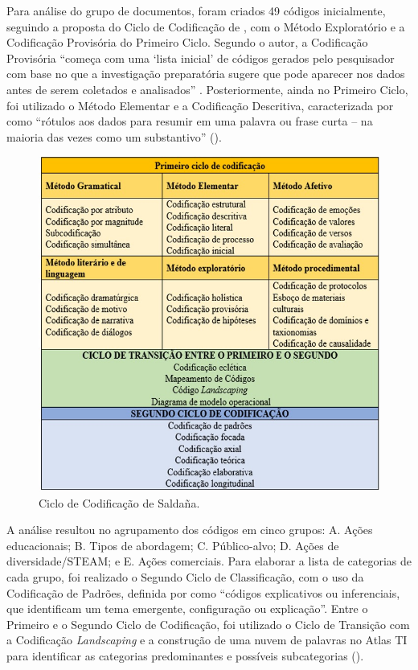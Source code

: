 \documentclass[portuguese]{textolivre}
\begin{document}
Para análise do grupo de documentos, foram criados 49 códigos inicialmente, seguindo a proposta do Ciclo de Codificação de \textcite{saldana_coding_2013}, com o Método Exploratório e a Codificação Provisória do Primeiro Ciclo. Segundo o autor, a Codificação Provisória ``começa com uma ‘lista inicial’ de códigos gerados pelo pesquisador com base no que a investigação preparatória sugere que pode aparecer nos dados antes de serem coletados e analisados'' \cite[p.100]{saldana_coding_2013}. Posteriormente, ainda no Primeiro Ciclo, foi utilizado o Método Elementar e a Codificação Descritiva, caracterizada por \textcite[p.~158]{saldana_coding_2013} como ``rótulos aos dados para resumir em uma palavra ou frase curta – na maioria das vezes como um substantivo'' ().

\begin{figure}
\centering
\begin{minipage}{0.8\textwidth}
\includegraphics[width=\linewidth]{Fig1.png}
\caption{Ciclo de Codificação de Saldaña.}
\label{fig1}
\end{minipage}
\end{figure}

A análise resultou no agrupamento dos códigos em cinco grupos: A. Ações educacionais; B. Tipos de abordagem; C. Público-alvo; D. Ações de diversidade/STEAM; e E. Ações comerciais. Para elaborar a lista de categorias de cada grupo, foi realizado o Segundo Ciclo de Classificação, com o uso da Codificação de Padrões, definida por \textcite[p.~233]{saldana_coding_2013} como ``códigos explicativos ou inferenciais, que identificam um tema emergente, configuração ou explicação''. Entre o Primeiro e o Segundo Ciclo de Codificação, foi utilizado o Ciclo de Transição com a Codificação \textit{Landscaping} e a construção de uma nuvem de palavras no Atlas TI para identificar as categorias predominantes e possíveis subcategorias ().
\end{document}

